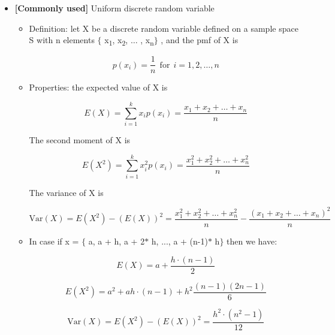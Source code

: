\documentclass[12pt]{report}
\renewcommand{\_}{\kern-1.5pt\textunderscore\kern-1.5pt}
\begin{document}
\begin{itemize}
	\item \textbf{[Commonly used]} Uniform discrete random variable\par

\begin{itemize}
	\item Definition: let X be a discrete random variable defined on a sample space S with n elements $ \{ $ x\textsubscript{1}, x\textsubscript{2}, $ \ldots $ , x\textsubscript{n}$ \} $ , and the pmf of X is\par

 \[ p \left( x_{i} \right) =\frac{1}{n}\mathrm{~~for~~}i=1, 2, \ldots ,n \] \par

	\item Properties: the expected value of X is\par

 \[ E \left( X \right) = \sum _{i=1}^{k}x_{i}p \left( x_{i} \right) =\frac{x_{1}+x_{2}+ \ldots +x_{n}}{n} \] \par

The second moment of X is\par

 \[ E \left( X^{2} \right) = \sum _{i=1}^{k}x_{i}^{2}p \left( x_{i} \right) =\frac{x_{1}^{2}+x_{2}^{2}+ \ldots +x_{n}^{2}}{n} \] \par

\tab The variance of X is \par

 \[ \mathrm{Var} \left( X \right) =E \left( X^{2} \right) - \left( E \left( X \right)  \right) ^{2}=\frac{x_{1}^{2}+x_{2}^{2}+ \ldots +x_{n}^{2}}{n}-\frac{ \left( x_{1}+x_{2}+ \ldots +x_{n} \right) ^{2}}{n} \] \par

	\item In case if x = $ \{ $ a, a + h, a + 2$\ast$ h, ..., a + (n-1)$\ast$ h$ \} $  then we have:\par

 \[ E \left( X \right) =a+\frac{h \cdot  \left( n-1 \right) }{2} \] \par

 \[ E \left( X^{2} \right) =a^{2}+ah \cdot  \left( n-1 \right) +h^{2}\frac{ \left( n-1 \right)  \left( 2n-1 \right) }{6} \] \par

 \[ \mathrm{Var} \left( X \right) =E \left( X^{2} \right) - \left( E \left( X \right)  \right) ^{2}=\frac{h^{2} \cdot  \left( n^{2}-1 \right) }{12} \] \par


\end{itemize}
\end{itemize}
\end{document}
